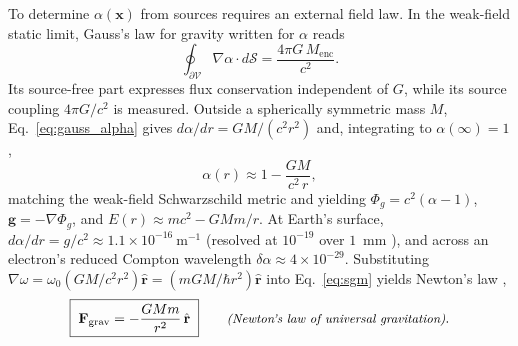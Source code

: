 \documentclass[aps,prd,onecolumn,tightenlines,nofootinbib,notitlepage,10pt,floatfix]{revtex4-2}
\theoremstyle{indentedtheorem}
\begin{document}
To determine $\alpha(\mathbf{x})$ from sources requires an external field law. In the weak-field static limit, Gauss's law for gravity \citep{Gauss1813Theoria,Gourgoulhon2007Formalism} written for $\alpha$ reads
\begin{equation}
    \oint_{\partial\mathcal{V}}\nabla\alpha\cdot d\boldsymbol{\mathcal{S}} = \frac{4\pi G \, M_\text{enc}}{c^2} .
    \label{eq:gauss_alpha}
\end{equation}
Its source-free part expresses flux conservation independent of $G$, while its source coupling $4\pi G/c^2$ is measured. Outside a spherically symmetric mass $M$, Eq.~\eqref{eq:gauss_alpha} gives $d\alpha/dr = GM/(c^2 r^2)$ and, integrating to $\alpha(\infty)=1$,
\begin{equation}
    \alpha(r) \approx 1 - \frac{GM}{c^2\,r} ,
    \label{eq:alpha_weak}
\end{equation}
matching the weak-field Schwarzschild metric \citep{Schwarzschild1916Metric,MTW1973Gravitation} and yielding $\Phi_g=c^2(\alpha-1)$, $\mathbf{g}=-\nabla\Phi_g$, and $E(r)\approx mc^2-GMm/r$. At Earth's surface, $d\alpha/dr=g/c^2\approx 1.1\times 10^{-16}~\text{m}^{-1}$ (resolved at $10^{-19}$ over $1$~mm \citep{Bothwell2022Resolving}), and across an electron's reduced Compton wavelength $\delta\alpha\approx 4\times 10^{-29}$. Substituting $\nabla\omega=\omega_0(GM/c^2r^2)\hat{\mathbf{r}}=(mGM/\hbar r^2)\hat{\mathbf{r}}$ into Eq.~\eqref{eq:sgm} yields Newton's law \citep{Newton1687Philosophiae},
\begin{equation}
    \boxed{\;\mathbf{F}_\text{grav} = -\frac{GMm}{r^2}\,\hat{\mathbf{r}}\;} \qquad \text{\small\itshape (Newton's law of universal gravitation)} .
    \label{eq:newton}
\end{equation}
\end{document}
